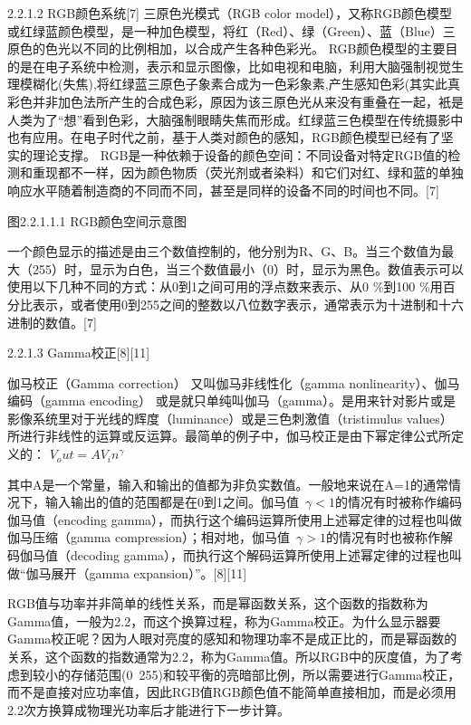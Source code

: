 2.2.1.2 RGB颜色系统[7]
	三原色光模式（RGB color model），又称RGB颜色模型或红绿蓝颜色模型，是一种加色模型，将红（Red）、绿（Green）、蓝（Blue）三原色的色光以不同的比例相加，以合成产生各种色彩光。
RGB颜色模型的主要目的是在电子系统中检测，表示和显示图像，比如电视和电脑，利用大脑强制视觉生理模糊化(失焦),将红绿蓝三原色子象素合成为一色彩象素,产生感知色彩(其实此真彩色并非加色法所产生的合成色彩，原因为该三原色光从来没有重叠在一起，衹是人类为了“想”看到色彩，大脑强制眼睛失焦而形成。红绿蓝三色模型在传统摄影中也有应用。在电子时代之前，基于人类对颜色的感知，RGB颜色模型已经有了坚实的理论支撑。
RGB是一种依赖于设备的颜色空间：不同设备对特定RGB值的检测和重现都不一样，因为颜色物质（荧光剂或者染料）和它们对红、绿和蓝的单独响应水平随着制造商的不同而不同，甚至是同样的设备不同的时间也不同。[7]
     
图2.2.1.1.1 RGB颜色空间示意图

一个颜色显示的描述是由三个数值控制的，他分别为R、G、B。当三个数值为最大（255）时，显示为白色，当三个数值最小（0）时，显示为黑色。数值表示可以使用以下几种不同的方式：从0到1之间可用的浮点数来表示、从0 \%到100 \%用百分比表示，或者使用0到255之间的整数以八位数字表示，通常表示为十进制和十六进制的数值。[7]

2.2.1.3 Gamma校正[8][11]
	
	伽马校正（Gamma correction） 又叫伽马非线性化（gamma nonlinearity）、伽马编码（gamma encoding） 或是就只单纯叫伽马（gamma）。是用来针对影片或是影像系统里对于光线的辉度（luminance）或是三色刺激值（tristimulus values）所进行非线性的运算或反运算。最简单的例子中，伽马校正是由下幂定律公式所定义的：
$V_out=AV_in^\gamma$
	
	其中A是一个常量，输入和输出的值都为非负实数值。一般地来说在A=1的通常情况下，输入输出的值的范围都是在0到1之间。伽马值~$\gamma < 1$的情况有时被称作编码伽马值（encoding gamma），而执行这个编码运算所使用上述幂定律的过程也叫做伽马压缩（gamma compression）；相对地，伽马值~$\gamma > 1$的情况有时也被称作解码伽马值（decoding gamma），而执行这个解码运算所使用上述幂定律的过程也叫做“伽马展开（gamma expansion）”。[8][11]
	
	RGB值与功率并非简单的线性关系，而是幂函数关系，这个函数的指数称为Gamma值，一般为2.2，而这个换算过程，称为Gamma校正。为什么显示器要Gamma校正呢？因为人眼对亮度的感知和物理功率不是成正比的，而是幂函数的关系，这个函数的指数通常为2.2，称为Gamma值。所以RGB中的灰度值，为了考虑到较小的存储范围(0~255)和较平衡的亮暗部比例，所以需要进行Gamma校正，而不是直接对应功率值，因此RGB值RGB颜色值不能简单直接相加，而是必须用2.2次方换算成物理光功率后才能进行下一步计算。
	
